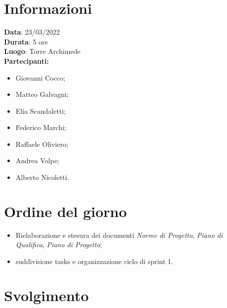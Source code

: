 \documentclass[a4paper, 12pt]{article}
\begin{document}
\makefrontpage

\section{Informazioni}
\textbf{Data}: 23/03/2022\\
\textbf{Durata}: 5 ore\\
\textbf{Luogo}: Torre Archimede\\

\textbf{Partecipanti:}
\begin{itemize}
	\item Giovanni Cocco;
	\item Matteo Galvagni;
	\item Elia Scandaletti;
	\item Federico Marchi;
	\item Raffaele Oliviero;
	\item Andrea Volpe;
	\item Alberto Nicoletti.
\end{itemize}


\section{Ordine del giorno}
\begin{itemize}
	\item Rielaborazione e stesura dei documenti \textit{Norme di Progetto}, \textit{Piano di Qualifica}, \textit{Piano di Progetto};
	\item suddivisione tasks e organizzazione ciclo di sprint 1.
\end{itemize}

\section{Svolgimento}
\end{document}
